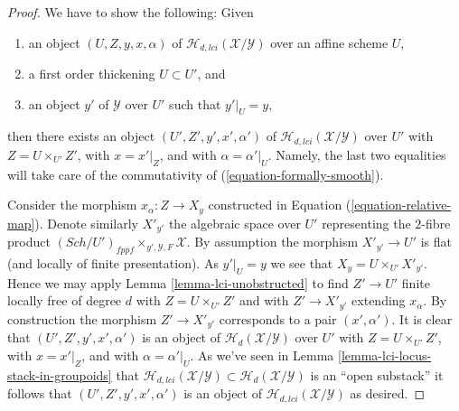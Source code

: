 \documentclass{stacks-project}
\theoremstyle{plain}
\theoremstyle{definition}
\theoremstyle{remark}
\numberwithin{equation}{subsection}
\def\Sch{\mathit{Sch}}
\begin{document}
\begin{proof}
We have to show the following: Given
\begin{enumerate}
\item an object $(U, Z, y, x, \alpha)$ of
$\mathcal{H}_{d, lci}(\mathcal{X}/\mathcal{Y})$ over an affine scheme $U$,
\item a first order thickening $U \subset U'$, and
\item an object $y'$ of $\mathcal{Y}$ over $U'$ such that $y'|_U = y$,
\end{enumerate}
then there exists an object $(U', Z', y', x', \alpha')$ of
$\mathcal{H}_{d, lci}(\mathcal{X}/\mathcal{Y})$ over $U'$ with
$Z = U \times_{U'} Z'$, with $x = x'|_Z$, and with
$\alpha = \alpha'|_U$. Namely, the last two equalities will take care
of the commutativity of (\ref{equation-formally-smooth}).

\medskip\noindent
Consider the morphism $x_\alpha : Z \to X_y$ constructed in
Equation (\ref{equation-relative-map}). Denote similarly $X'_{y'}$
the algebraic space over $U'$ representing the $2$-fibre product
$(\Sch/U')_{fppf} \times_{y', \mathcal{Y}, F} \mathcal{X}$.
By assumption the morphism $X'_{y'} \to U'$ is flat (and locally of finite
presentation). As $y'|_U = y$ we see that $X_y = U \times_{U'} X'_{y'}$.
Hence we may apply
Lemma \ref{lemma-lci-unobstructed}
to find $Z' \to U'$ finite locally free of degree $d$ with
$Z = U \times_{U'} Z'$ and with $Z' \to X'_{y'}$ extending $x_\alpha$.
By construction the morphism $Z' \to X'_{y'}$ corresponds to a pair
$(x', \alpha')$. It is clear that $(U', Z', y', x', \alpha')$
is an object of $\mathcal{H}_d(\mathcal{X}/\mathcal{Y})$ over $U'$
with $Z = U \times_{U'} Z'$, with $x = x'|_Z$, and with
$\alpha = \alpha'|_U$. As we've seen in
Lemma \ref{lemma-lci-locus-stack-in-groupoids}
that $\mathcal{H}_{d, lci}(\mathcal{X}/\mathcal{Y}) \subset
\mathcal{H}_d(\mathcal{X}/\mathcal{Y})$ is an ``open substack''
it follows that $(U', Z', y', x', \alpha')$ is an object of
$\mathcal{H}_{d, lci}(\mathcal{X}/\mathcal{Y})$ as desired.
\end{proof}
\end{document}
